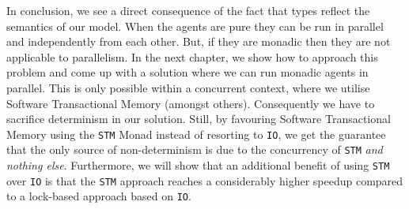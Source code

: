 In conclusion, we see a direct consequence of the fact that types reflect the semantics of our model. When the agents are pure they can be run in parallel and independently from each other. But, if they are monadic then they are not applicable to parallelism. In the next chapter, we show how to approach this problem and come up with a solution where we can run monadic agents in parallel. This is only possible within a concurrent context, where we utilise Software Transactional Memory (amongst others). Consequently we have to sacrifice determinism in our solution. Still, by favouring Software Transactional Memory using the \texttt{STM} Monad instead of resorting to \texttt{IO}, we get the guarantee that the only source of non-determinism is due to the concurrency of \texttt{STM} \textit{and nothing else}. Furthermore, we will show that an additional benefit of using \texttt{STM} over \texttt{IO} is that the \texttt{STM} approach reaches a considerably higher speedup compared to a lock-based approach based on \texttt{IO}. 